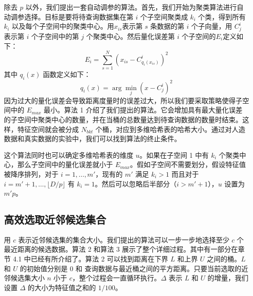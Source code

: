除去 $p$ 以外，我们提出一套自动调参的算法。首先，我们开始为聚类算法进行自动调参选择。目标是要将待查询数据集在第 $i$ 个子空间聚类成 $k_i$ 个类，得到所有 ${k_i}$ 以及每个子空间中的聚类中心。用$x_{is}$表示第 $s$ 条数据的第 $i$ 个子向量，用 $C_j^i$ 表示第 $i$ 个子空间中的第 $j$ 个聚类中心。然后量化误差第 $i$ 个子空间的$E_i$定义如下：
\begin{equation*}
E_i = \sum_{s=1}^N\left( x_{is} - C^i_{q_i(x_{is})}\right)^2
\end{equation*}
其中 $q_i(x)$ 函数定义如下：
\begin{equation*}
q_i(x) = \arg\min_{j} \left( x - C^i_j\right)^2
\end{equation*}
因为过大的量化误差会导致距离度量时的误差过大，所以我们要采取策略使得子空间中的 $E_{max}$ 最小。算法 1 介绍了我们提出的算法。它会增加具有最大量化误差的子空间中聚类中心的数量，并在当桶的总数量达到待查询数据的数量时结束。这样，特征空间就会被分成 $N_{bkt}$ 个桶，对应到多维哈希表的哈希大小。通过对人造数据和真实数据的实验中，我们可以找到算法的终止条件。

这个算法同时也可以确定多维哈希表的维度 $u$。如果在子空间 1 中有 $k_i$ 个聚类中心，那么子空间中的量化误差就小于 $E_{max}$。假如子空间不需要划分，假设特征值被降序排列，对于 $i=1,\ldots,m'$，现有的 $m'$ 满足 $k_i > 1$ 而且对于 $i=m'+1,\ldots,\lfloor D/p\rfloor$ 有 $k_i=1$。然后可以忽略后半部分（$i>m'+1$），$u$ 设置为 $m'p$。
\subsection{高效选取近邻候选集合}
用 $c$ 表示近邻候选集的集合大小。我们提出的算法可以一步一步地选择至少 $c$ 个最近距离的候选数据。算法 2 和算法 3 展示了整个详细过程。其中有一部分在章节 4.1 中已经有所介绍了。算法 2 可以找到距离在下界 $L$ 和上界 $U$ 之间的桶。$L$ 和 $U$ 的初始值分别是 0 和 查询数据与最近桶之间的平方距离。只要当前选取的近邻候选集大小 $n$ 小于 $c$，整个过程会一直循环执行。$\Delta$ 表示 $L$ 和 $U$ 的增量，我们设置 $\Delta$ 的大小为特征值之和的 $1/100$。
